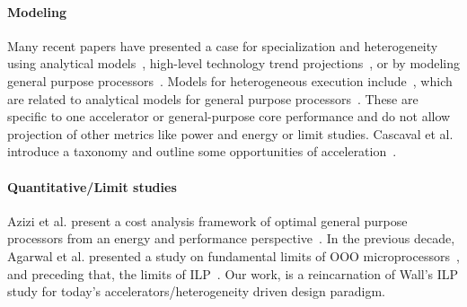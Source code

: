 \paragraph{Modeling}
Many recent papers have presented a case for specialization and
heterogeneity using analytical
models~\cite{Chung:2010,6336691,Navigo}, high-level technology trend
projections~\cite{DBLP:journals/cacm/BorkarC11,6164927}, or by
modeling general purpose processors~\cite{isca11:dark-silicon}.
Models for heterogeneous execution
include~\cite{boat-hull1,boat-hull0,Williams:2009:RIV:1498765.1498785,
  Hong:2010:IGP:1815961.1815998,hongkimperf2,meng2011grophecy,Wang:2009:PMR:1616625.1616631,6114198},
which are related to analytical models for general purpose
processors~\cite{Eyerman:2009:MPM:1534909.1534910,doi:10.2200/S00273ED1V01Y201006CAC010}.
These are specific to one accelerator or general-purpose core
performance and do not allow projection of other metrics like power
and energy or limit studies. Cascaval et al. introduce a taxonomy and
outline some opportunities of acceleration~\cite{Cascaval:2010:TAA:1940702.1940705}.


\paragraph{Quantitative/Limit studies}
 Azizi et al. present a cost analysis framework of
optimal general purpose processors from an energy and performance
perspective~\cite{Azizi:2010:ETP:1815961.1815967}.  In the previous
decade, Agarwal et al. presented a study on fundamental limits of OOO
microprocessors~\cite{Agarwal01:ISCA}, and preceding that, the limits
of ILP~\cite{Wall:1991:LIP:106972.106991}. Our work, is a
reincarnation of  Wall's ILP study for today's accelerators/heterogeneity driven design paradigm.
